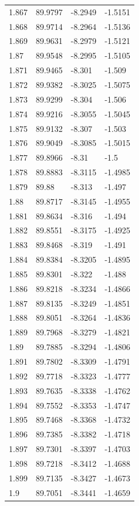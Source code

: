 \begin{tabular}{llll}
1.867 & 89.9797 & -8.2949 & -1.5151 \\
1.868 & 89.9714 & -8.2964 & -1.5136 \\
1.869 & 89.9631 & -8.2979 & -1.5121 \\
1.87 & 89.9548 & -8.2995 & -1.5105 \\
1.871 & 89.9465 & -8.301 & -1.509 \\
1.872 & 89.9382 & -8.3025 & -1.5075 \\
1.873 & 89.9299 & -8.304 & -1.506 \\
1.874 & 89.9216 & -8.3055 & -1.5045 \\
1.875 & 89.9132 & -8.307 & -1.503 \\
1.876 & 89.9049 & -8.3085 & -1.5015 \\
1.877 & 89.8966 & -8.31 & -1.5 \\
1.878 & 89.8883 & -8.3115 & -1.4985 \\
1.879 & 89.88 & -8.313 & -1.497 \\
1.88 & 89.8717 & -8.3145 & -1.4955 \\
1.881 & 89.8634 & -8.316 & -1.494 \\
1.882 & 89.8551 & -8.3175 & -1.4925 \\
1.883 & 89.8468 & -8.319 & -1.491 \\
1.884 & 89.8384 & -8.3205 & -1.4895 \\
1.885 & 89.8301 & -8.322 & -1.488 \\
1.886 & 89.8218 & -8.3234 & -1.4866 \\
1.887 & 89.8135 & -8.3249 & -1.4851 \\
1.888 & 89.8051 & -8.3264 & -1.4836 \\
1.889 & 89.7968 & -8.3279 & -1.4821 \\
1.89 & 89.7885 & -8.3294 & -1.4806 \\
1.891 & 89.7802 & -8.3309 & -1.4791 \\
1.892 & 89.7718 & -8.3323 & -1.4777 \\
1.893 & 89.7635 & -8.3338 & -1.4762 \\
1.894 & 89.7552 & -8.3353 & -1.4747 \\
1.895 & 89.7468 & -8.3368 & -1.4732 \\
1.896 & 89.7385 & -8.3382 & -1.4718 \\
1.897 & 89.7301 & -8.3397 & -1.4703 \\
1.898 & 89.7218 & -8.3412 & -1.4688 \\
1.899 & 89.7135 & -8.3427 & -1.4673 \\
1.9 & 89.7051 & -8.3441 & -1.4659 \\

\end{tabular}
